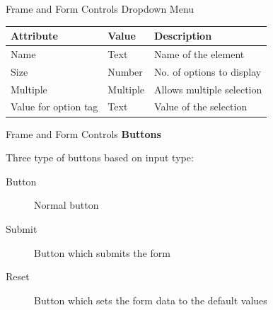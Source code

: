 \documentclass[14pt]{beamer}
\begin{document}
\begin{frame}{Frame and Form Controls}
Dropdown Menu

\vspace{.5pc}
\begin{tabular}{|p{2.5cm}|p{2.5cm}|p{4cm}|}
\hline 
\textbf{Attribute} & \textbf{Value} & \textbf{Description} \\ \hline
Name  & Text & Name of the element \\ \hline
Size & Number & No. of options to display \\ \hline
Multiple & Multiple & Allows multiple selection \\ \hline
Value for option tag & Text & Value of the selection \\ \hline
\end{tabular}
\end{frame}

\begin{frame}{Frame and Form Controls}
\textbf{Buttons}

\vspace{1pc}
Three type of buttons based on input type:
\begin{description}
 \item [Button] Normal button 
 \item [Submit] Button which submits the form
 \item [ Reset] Button which sets the form data to the default values
\end{description}
\end{frame}
\end{document}
